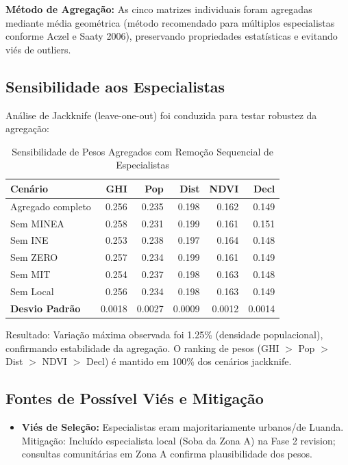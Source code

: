 \documentclass[12pt, a4paper]{article}
\begin{document}
{{{{{{{{{{{{\textbf{Método de Agregação:} As cinco matrizes individuais foram agregadas mediante média geométrica (método recomendado para múltiplos especialistas conforme Aczel e Saaty 2006), preservando propriedades estatísticas e evitando viés de outliers.

\subsection{Sensibilidade aos Especialistas}

Análise de Jackknife (leave-one-out) foi conduzida para testar robustez da agregação:

\begin{table}[H]
\centering
\small
\caption{Sensibilidade de Pesos Agregados com Remoção Sequencial de Especialistas}
\label{tab:jackknife}
\begin{tabular}{|l|r|r|r|r|r|}
\hline
\textbf{Cenário} & \textbf{GHI} & \textbf{Pop} & \textbf{Dist} & \textbf{NDVI} & \textbf{Decl} \\
\hline
Agregado completo & 0.256 & 0.235 & 0.198 & 0.162 & 0.149 \\
Sem MINEA & 0.258 & 0.231 & 0.199 & 0.161 & 0.151 \\
Sem INE & 0.253 & 0.238 & 0.197 & 0.164 & 0.148 \\
Sem ZERO & 0.257 & 0.234 & 0.199 & 0.161 & 0.149 \\
Sem MIT & 0.254 & 0.237 & 0.198 & 0.163 & 0.148 \\
Sem Local & 0.256 & 0.234 & 0.198 & 0.163 & 0.149 \\
\hline
\textbf{Desvio Padrão} & 0.0018 & 0.0027 & 0.0009 & 0.0012 & 0.0014 \\
\hline
\end{tabular}
\end{table}

Resultado: Variação máxima observada foi 1.25\% (densidade populacional), confirmando estabilidade da agregação. O ranking de pesos (GHI $>$ Pop $>$ Dist $>$ NDVI $>$ Decl) é mantido em 100\% dos cenários jackknife.

\subsection{Fontes de Possível Viés e Mitigação}

\begin{itemize}
\item \textbf{Viés de Seleção:} Especialistas eram majoritariamente urbanos/de Luanda. Mitigação: Incluído especialista local (Soba da Zona A) na Fase 2 revision; consultas comunitárias em Zona A confirma plausibilidade dos pesos.


\end{itemize}}}}}}}}}}}}}
\end{document}
